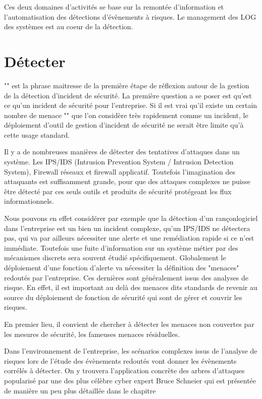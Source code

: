 Ces deux domaines d'activités se base sur la remontée d'information et l'automatisation des détections d'évènements à risques. Le management des LOG des systèmes est au coeur de la détection.


\section{Détecter}

"" est la phrase maitresse de la première étape de réflexion autour de la gestion de la détection d'incident de sécurité.
La première question a se poser est qu'est ce qu'un incident de sécurité pour l'entreprise. Si il est vrai qu'il existe un certain nombre de menace "" que l'on considère très rapidement comme un incident, le déploiement d'outil de gestion d'incident de sécurité ne serait être limite qu'à cette usage standard.

Il y a de nombreuses manières de détecter des tentatives d'attaques dans un système. Les IPS/IDS (Intrusion Prevention System / Intrusion Detection System), Firewall réseaux et firewall applicatif. Toutefois l'imagination des attaquants est suffisamment grande, pour que des attaques complexes ne puisse être détecté par ces seuls outils et produits de sécurité protégeant les flux informationnels.


Nous pouvons en effet considérer par exemple que la détection d'un rançonlogiciel dans l'entreprise est un bien un incident complexe, qu'un IPS/IDS ne détectera pas,  qui va par ailleurs nécessiter une alerte et une remédiation rapide si ce n'est immédiate.
Toutefois une fuite d'information sur un système métier par des mécanismes discrets sera souvent étudié spécifiquement.
Globalement le déploiement d'une fonction d'alerte va nécessiter la définition des "menaces" redoutés par l'entreprise. 
Ces dernières sont généralement issus des analyses de risque.
En effet, il est important au delà des menaces dits standards de revenir au source du déploiement de fonction de sécurité qui sont de gérer et couvrir les risques.

En premier lieu, il convient de chercher à détecter les menaces non couvertes par les mesures de sécurité, les fameuses menaces résiduelles.

Dans l'environnement de l'entreprise, les scénarios complexes issus de l'analyse de risques lors de l'étude des évènements redoutés vont donner les évènements corrélés à détecter.
On y trouvera l'application concrète des arbres d'attaques popularisé par une des plus célèbre cyber expert Bruce Schneier \cite{schneier1999attack} qui est présentée de manière un peu plus détaillée dans le chapitre 



